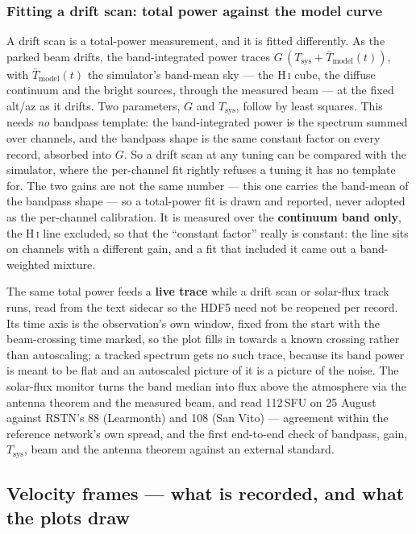 \documentclass[11pt,a4paper]{article}
\begin{document}
\subsubsection{Fitting a drift scan: total power against the model curve}
\label{sec:liveplot}

A drift scan is a total-power measurement, and it is fitted differently. As the parked beam drifts, the band-integrated power traces $G\,(T_\text{sys} + \bar{T}_\text{model}(t))$, with $\bar{T}_\text{model}(t)$ the simulator's band-mean sky --- the H\,\textsc{i} cube, the diffuse continuum and the bright sources, through the measured beam --- at the fixed alt/az as it drifts. Two parameters, $G$ and $T_\text{sys}$, follow by least squares. This needs \emph{no} bandpass template: the band-integrated power is the spectrum summed over channels, and the bandpass shape is the same constant factor on every record, absorbed into $G$. So a drift scan at any tuning can be compared with the simulator, where the per-channel fit rightly refuses a tuning it has no template for. The two gains are not the same number --- this one carries the band-mean of the bandpass shape --- so a total-power fit is drawn and reported, never adopted as the per-channel calibration. It is measured over the \textbf{continuum band only}, the H\,\textsc{i} line excluded, so that the ``constant factor'' really is constant: the line sits on channels with a different gain, and a fit that included it came out a band-weighted mixture.

The same total power feeds a \textbf{live trace} while a drift scan or solar-flux track runs, read from the text sidecar so the HDF5 need not be reopened per record. Its time axis is the observation's own window, fixed from the start with the beam-crossing time marked, so the plot fills in towards a known crossing rather than autoscaling; a tracked spectrum gets no such trace, because its band power is meant to be flat and an autoscaled picture of it is a picture of the noise. The solar-flux monitor turns the band median into flux above the atmosphere via the antenna theorem and the measured beam, and read 112\,SFU on 25 August against RSTN's 88 (Learmonth) and 108 (San Vito) --- agreement within the reference network's own spread, and the first end-to-end check of bandpass, gain, $T_\text{sys}$, beam and the antenna theorem against an external standard.

\subsection{Velocity frames --- what is recorded, and what the plots draw}
\label{sec:lsr}
\end{document}
